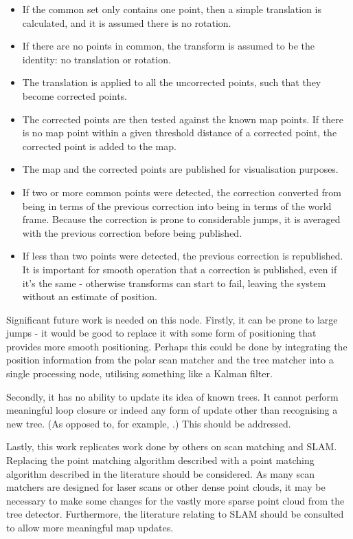 \documentclass[12pt,oneside,a4paper]{book}
\begin{document}
\begin{itemize}
\item If the common set only contains one point, then a simple
  translation is calculated, and it is assumed there is no rotation. 
\item If there are no points in common, the transform is assumed to be
  the identity: no translation or rotation. 
\item The translation is applied to all the uncorrected points, such
  that they become corrected points.
\item The corrected points are then tested against the known map
  points. If there is no map point within a given threshold distance
  of a corrected point, the corrected point is added to the map.
\item The map and the corrected points are published for visualisation
  purposes.
\item If two or more common points were detected, the correction
  converted from being in terms of the previous correction into being
  in terms of the world frame. Because the correction is prone to
  considerable jumps, it is averaged with the previous correction
  before being published.
\item If less than two points were detected, the previous correction
  is republished. It is important for smooth operation that a
  correction is published, even if it's the same - otherwise
  transforms can start to fail, leaving the system without an estimate
  of position.
\end{itemize}

Significant future work is needed on this node.  Firstly, it can be
prone to large jumps - it would be good to replace it with some form
of positioning that provides more smooth positioning. Perhaps this
could be done by integrating the position information from the polar
scan matcher and the tree matcher into a single processing node,
utilising something like a Kalman filter. 

Secondly, it has no ability to update its idea of known trees. It
cannot perform meaningful loop closure or indeed any form of update
other than recognising a new tree. (As opposed to, for example,
.) This should be addressed.

Lastly, this work replicates work done by others on scan matching and
SLAM. Replacing the point matching algorithm described with a point
matching algorithm described in the literature should be considered.
As many scan matchers are designed for laser scans or other dense
point clouds, it may be necessary to make some changes for the vastly
more sparse point cloud from the tree detector. Furthermore, the
literature relating to SLAM should be consulted to allow more
meaningful map updates.
\end{document}
